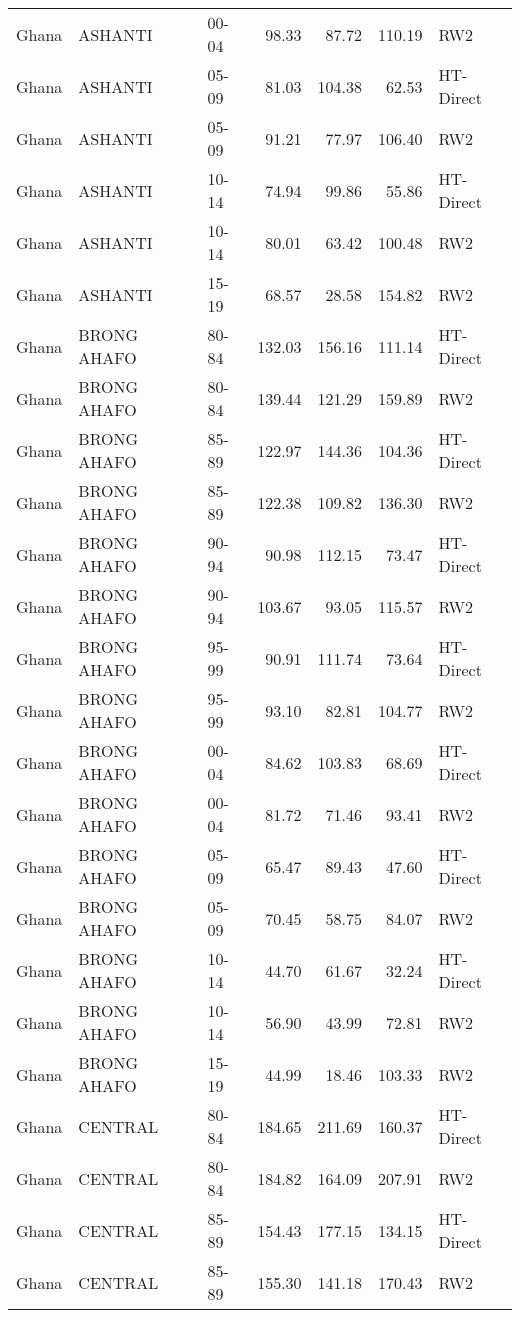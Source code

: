 \begin{longtable}{lllrrrl}
  Ghana & ASHANTI & 00-04 & 98.33 & 87.72 & 110.19 & RW2 \\ 
  Ghana & ASHANTI & 05-09 & 81.03 & 104.38 & 62.53 & HT-Direct \\ 
  Ghana & ASHANTI & 05-09 & 91.21 & 77.97 & 106.40 & RW2 \\ 
  Ghana & ASHANTI & 10-14 & 74.94 & 99.86 & 55.86 & HT-Direct \\ 
  Ghana & ASHANTI & 10-14 & 80.01 & 63.42 & 100.48 & RW2 \\ 
  Ghana & ASHANTI & 15-19 & 68.57 & 28.58 & 154.82 & RW2 \\ 
  Ghana & BRONG AHAFO & 80-84 & 132.03 & 156.16 & 111.14 & HT-Direct \\ 
  Ghana & BRONG AHAFO & 80-84 & 139.44 & 121.29 & 159.89 & RW2 \\ 
  Ghana & BRONG AHAFO & 85-89 & 122.97 & 144.36 & 104.36 & HT-Direct \\ 
  Ghana & BRONG AHAFO & 85-89 & 122.38 & 109.82 & 136.30 & RW2 \\ 
  Ghana & BRONG AHAFO & 90-94 & 90.98 & 112.15 & 73.47 & HT-Direct \\ 
  Ghana & BRONG AHAFO & 90-94 & 103.67 & 93.05 & 115.57 & RW2 \\ 
  Ghana & BRONG AHAFO & 95-99 & 90.91 & 111.74 & 73.64 & HT-Direct \\ 
  Ghana & BRONG AHAFO & 95-99 & 93.10 & 82.81 & 104.77 & RW2 \\ 
  Ghana & BRONG AHAFO & 00-04 & 84.62 & 103.83 & 68.69 & HT-Direct \\ 
  Ghana & BRONG AHAFO & 00-04 & 81.72 & 71.46 & 93.41 & RW2 \\ 
  Ghana & BRONG AHAFO & 05-09 & 65.47 & 89.43 & 47.60 & HT-Direct \\ 
  Ghana & BRONG AHAFO & 05-09 & 70.45 & 58.75 & 84.07 & RW2 \\ 
  Ghana & BRONG AHAFO & 10-14 & 44.70 & 61.67 & 32.24 & HT-Direct \\ 
  Ghana & BRONG AHAFO & 10-14 & 56.90 & 43.99 & 72.81 & RW2 \\ 
  Ghana & BRONG AHAFO & 15-19 & 44.99 & 18.46 & 103.33 & RW2 \\ 
  Ghana & CENTRAL & 80-84 & 184.65 & 211.69 & 160.37 & HT-Direct \\ 
  Ghana & CENTRAL & 80-84 & 184.82 & 164.09 & 207.91 & RW2 \\ 
  Ghana & CENTRAL & 85-89 & 154.43 & 177.15 & 134.15 & HT-Direct \\ 
  Ghana & CENTRAL & 85-89 & 155.30 & 141.18 & 170.43 & RW2 \\ 

\end{longtable}
